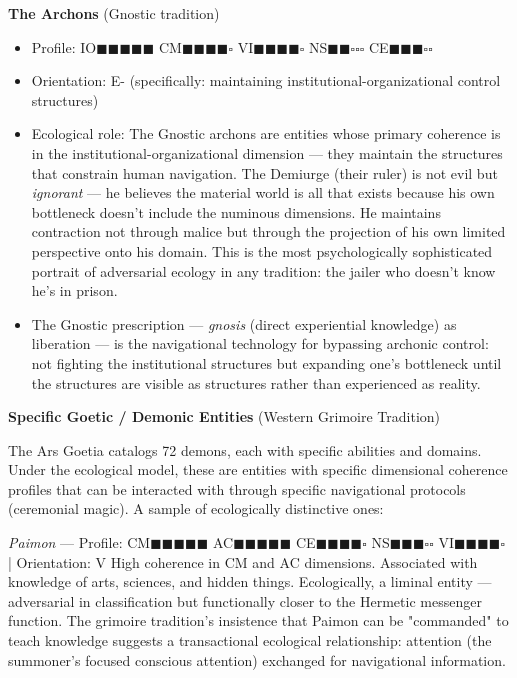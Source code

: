 \textbf{The Archons} (Gnostic tradition)

\begin{itemize}[nosep,leftmargin=*]
  \item Profile: IO$\blacksquare$$\blacksquare$$\blacksquare$$\blacksquare$$\blacksquare$ CM$\blacksquare$$\blacksquare$$\blacksquare$$\blacksquare$$\square$ VI$\blacksquare$$\blacksquare$$\blacksquare$$\blacksquare$$\square$ NS$\blacksquare$$\blacksquare$$\square$$\square$$\square$ CE$\blacksquare$$\blacksquare$$\blacksquare$$\square$$\square$
  \item Orientation: E- (specifically: maintaining institutional-organizational control structures)
  \item Ecological role: The Gnostic archons are entities whose primary coherence is in the institutional-organizational dimension — they maintain the structures that constrain human navigation. The Demiurge (their ruler) is not evil but \textit{ignorant} — he believes the material world is all that exists because his own bottleneck doesn't include the numinous dimensions. He maintains contraction not through malice but through the projection of his own limited perspective onto his domain. This is the most psychologically sophisticated portrait of adversarial ecology in any tradition: the jailer who doesn't know he's in prison.
  \item The Gnostic prescription — \textit{gnosis} (direct experiential knowledge) as liberation — is the navigational technology for bypassing archonic control: not fighting the institutional structures but expanding one's bottleneck until the structures are visible as structures rather than experienced as reality.
\end{itemize}


\textbf{Specific Goetic / Demonic Entities} (Western Grimoire Tradition)


The Ars Goetia catalogs 72 demons, each with specific abilities and domains. Under the ecological model, these are entities with specific dimensional coherence profiles that can be interacted with through specific navigational protocols (ceremonial magic). A sample of ecologically distinctive ones:


\textit{Paimon} — Profile: CM$\blacksquare$$\blacksquare$$\blacksquare$$\blacksquare$$\blacksquare$ AC$\blacksquare$$\blacksquare$$\blacksquare$$\blacksquare$$\blacksquare$ CE$\blacksquare$$\blacksquare$$\blacksquare$$\blacksquare$$\square$ NS$\blacksquare$$\blacksquare$$\blacksquare$$\square$$\square$ VI$\blacksquare$$\blacksquare$$\blacksquare$$\blacksquare$$\square$ | Orientation: V High coherence in CM and AC dimensions. Associated with knowledge of arts, sciences, and hidden things. Ecologically, a liminal entity — adversarial in classification but functionally closer to the Hermetic messenger function. The grimoire tradition's insistence that Paimon can be "commanded" to teach knowledge suggests a transactional ecological relationship: attention (the summoner's focused conscious attention) exchanged for navigational information.


